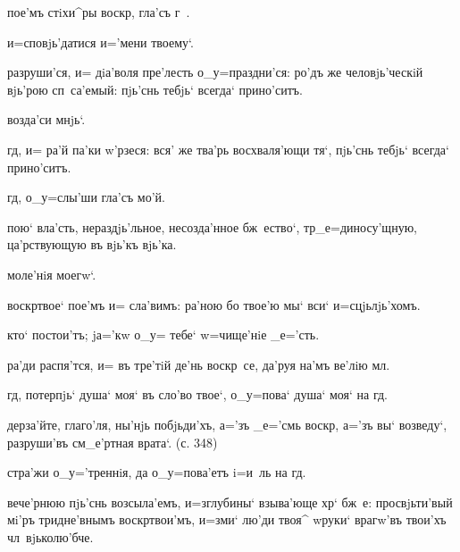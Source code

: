 
пое'мъ стiхи^ры воскр, гла'съ г~.%

и=сповjь'датися и='мени твоему`.

разруши'ся, и= дiа'воля пре'лесть о_у=праздни'ся: ро'дъ 
же человjь'ческiй вjь'рою сп~са'емый: пjь'снь тебjь` 
всегда` прино'ситъ.

возда'си мнjь`.

гд, и= ра'й па'ки w'рзеся: вся' же тва'рь 
восхваля'ющи тя`, пjь'снь тебjь` всегда` прино'ситъ.

гд, о_у=слы'ши гла'съ мо'й.

пою` вла'сть, нераздjь'льное, несозда'нное бж~ество`, 
тр _е=диносу'щную, ца'рствующую въ вjь'къ вjь'ка.


моле'нiя моегw`.

воскр твое` пое'мъ и= сла'вимъ: ра'ною бо твое'ю мы` 
вси` и=сцjьлjь'хомъ.

кто` постои'тъ; jа='кw о_у= тебе` w=чище'нiе _е='сть.

ра'ди распя'тся, и= въ тре'тiй де'нь воскр~се, да'руя 
на'мъ ве'лiю мл.

гд, потерпjь` душа` моя` въ сло'во твое`, о_у=пова` 
душа` моя` на гд.

дерза'йте, глаго'ля, ны'нjь побjьди'хъ, а='зъ _е='смь 
воскр, а='зъ вы` возведу`, разруши'въ см_е'ртная 
врата`. (с. 348) 

стра'жи о_у='треннiя, да о_у=пова'етъ i=и~ль на гд.

вече'рнюю пjь'снь возсыла'емъ, и=з\ъ глубины` взыва'юще 
хр` бж~е: просвjьти'вый мi'ръ тридне'внымъ 
воскр твои'мъ, и=зми` лю'ди твоя^ w\т руки` 
врагw'въ твои'хъ чл~вjьколю'бче.

